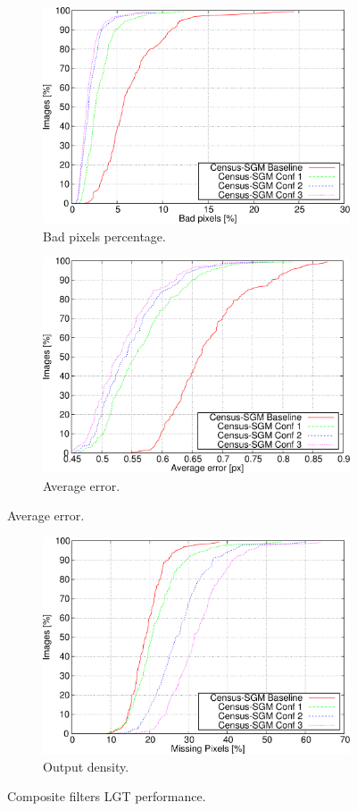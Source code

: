\begin{figure}[h!]
  \centering
  \begin{subfigure}[h]{\textwidth}
    \centering
    \includegraphics[width=\textwidth, height=0.5\textwidth, trim=0 0 0 0,clip]{comp_bpp}
    \caption{ Bad pixels percentage. }
    \label{fig:cp03_composite_LGT_bpp}
  \end{subfigure}%
  
  \begin{subfigure}[h]{\textwidth}
    \centering
    \includegraphics[width=\textwidth, height=0.5\textwidth, trim=0 0 0 0,clip]{comp_avg}
    \caption{ Average error. }
    \label{fig:cp03_composite_LGT_avg}
  \end{subfigure}%
\end{figure}

\begin{figure}[h!]
  \ContinuedFloat
  \begin{subfigure}[h]{\textwidth}
    \centering
    \includegraphics[width=\textwidth, height=0.5\textwidth, trim=0 0 0 0,clip]{comp_dens}
    \caption{ Output density. }
    \label{fig:cp03_composite_LGT_dens}
  \end{subfigure}%
  \caption{ Composite filters LGT performance. }
\end{figure}

